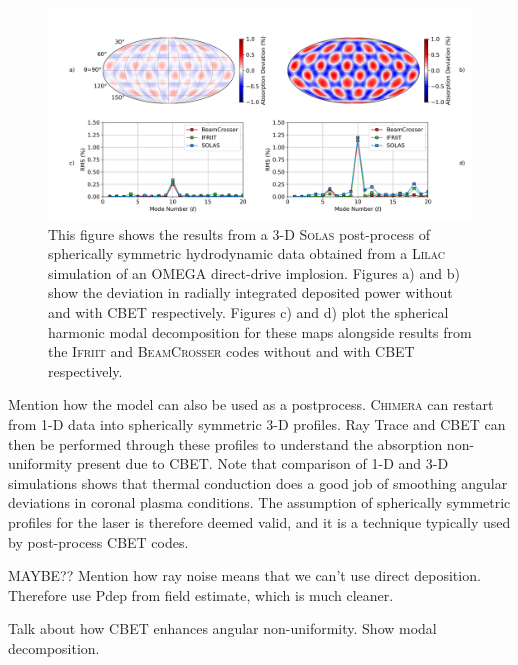 \begin{figure}[t!]
    \includegraphics[width=1.0\linewidth]{Numerics/Images/DepositionAsymmetries_mollweide_xy32.png}
    \centering
    \caption{This figure shows the results from a 3-D \textsc{Solas} post-process of spherically symmetric hydrodynamic data obtained from a \textsc{Lilac} simulation of an OMEGA direct-drive implosion.
    Figures a) and b) show the deviation in radially integrated deposited power without and with \ac{CBET} respectively.
    Figures c) and d) plot the spherical harmonic modal decomposition for these maps alongside results from the \textsc{Ifriit} and \textsc{BeamCrosser} codes without and with \ac{CBET} respectively.}%
    \label{fig:SOLAS_qpR_IFRIIT_test}
\end{figure}

Mention how the model can also be used as a postprocess.
\textsc{Chimera} can restart from 1-D data into spherically symmetric 3-D profiles.
Ray Trace and CBET can then be performed through these profiles to understand the absorption non-uniformity present due to CBET.
Note that comparison of 1-D and 3-D simulations shows that thermal conduction does a good job of smoothing angular deviations in coronal plasma conditions.
The assumption of spherically symmetric profiles for the laser is therefore deemed valid, and it is a technique typically used by post-process CBET codes.

MAYBE??
Mention how ray noise means that we can't use direct deposition.
Therefore use Pdep from field estimate, which is much cleaner.

Talk about how CBET enhances angular non-uniformity.
Show modal decomposition.


